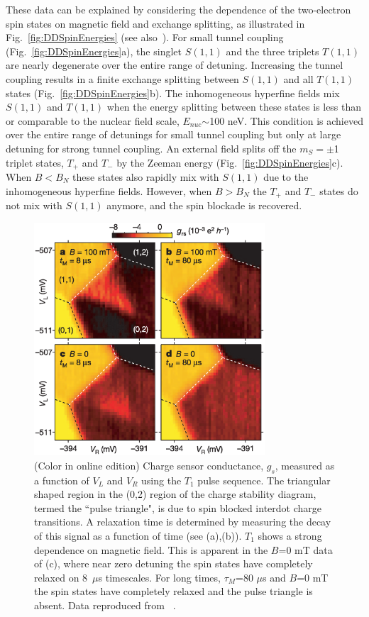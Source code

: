 \documentclass[rmp,twocolumn,aps]{revtex4}
\begin{document}
These data can be explained by considering the dependence of the
two-electron spin states on magnetic field and exchange splitting,
as illustrated in Fig.~\ref{fig:DDSpinEnergies} (see
also~\cite{jouravlev05,coish05}). For small tunnel coupling
(Fig.~\ref{fig:DDSpinEnergies}a), the singlet $S(1,1)$ and the three triplets $T(1,1)$ are nearly
degenerate over the entire range of detuning. Increasing the
tunnel coupling results in a finite exchange splitting between
$S(1,1)$ and all $T(1,1)$ states (Fig.~\ref{fig:DDSpinEnergies}b). The
inhomogeneous hyperfine fields mix $S(1,1)$ and $T(1,1)$ when the
energy splitting between these states is less than or comparable
to the nuclear field scale, $E_{nuc}$$\sim$100 neV. This condition
is achieved over the entire range of detunings for small tunnel
coupling but only at large detuning for strong tunnel coupling. An
external field splits off the $m_S=\pm$1 triplet states, $T_+$ and
$T_-$ by the Zeeman energy (Fig.~\ref{fig:DDSpinEnergies}c). When
$B<B_{N}$ these states also rapidly mix with $S(1,1)$ due to the
inhomogeneous hyperfine fields. However, when $B>B_{N}$ the
$T_+$ and $T_-$ states do not mix with $S(1,1)$ anymore, and
the spin blockade is recovered.

\begin{figure}[htb]
\includegraphics[width=8.6cm]{hanson_fig39.eps}
\caption{(Color in online edition) Charge sensor conductance, $g_s$,
measured as a function of $V_L$ and $V_R$ using the $T_1$ pulse
sequence. The triangular shaped region in the (0,2) region of the
charge stability diagram, termed the ``pulse triangle", is due to
spin blocked interdot charge transitions. A relaxation time is
determined by measuring the decay of this signal as a function of
time (see (a),(b)). $T_1$ shows a strong dependence on magnetic
field. This is apparent in the $B$=0 mT data of (c), where near
zero detuning the spin states have completely relaxed on 8~$\mu$s
timescales. For long times, $\tau_M$=80 $\mu$s and $B$=0 mT the
spin states have completely relaxed and the pulse triangle is
absent. Data reproduced from ~\textcite{johnson05}.}
\label{Fig:Johnson:Triangle}
\end{figure}
\end{document}
